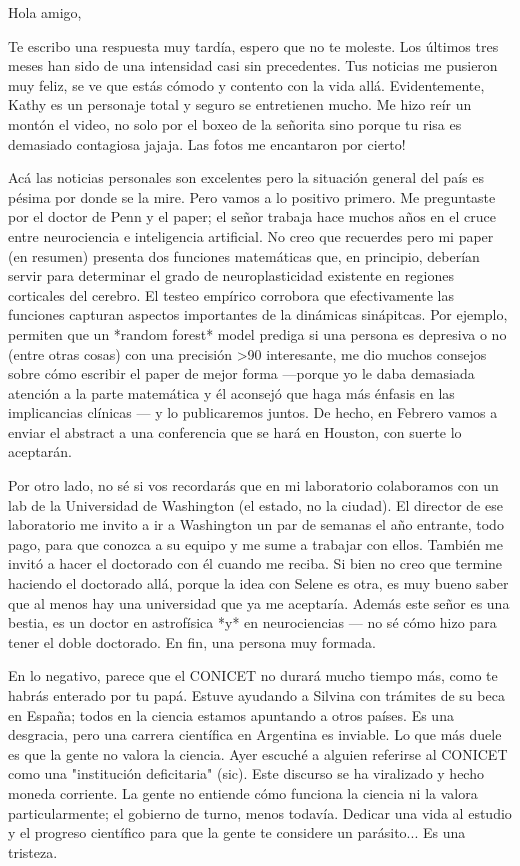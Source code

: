 \documentclass[a4paper]{article}
\begin{document}
    

Hola amigo,

Te escribo una respuesta muy tardía, espero que no te moleste. Los
últimos tres meses han sido de una intensidad casi sin precedentes. Tus noticias
me pusieron muy feliz, se ve que estás cómodo y contento con la vida allá.
Evidentemente, Kathy es un personaje total y seguro se entretienen mucho. Me
hizo reír un montón el video, no solo por el boxeo de la señorita sino porque tu
risa es demasiado contagiosa jajaja. Las fotos me encantaron por cierto! 

Acá las noticias personales son excelentes pero la situación general del país es
pésima por donde se la mire. Pero vamos a lo positivo primero. Me preguntaste
por el doctor de Penn y el paper; el señor trabaja hace muchos años en el cruce
entre neurociencia e inteligencia artificial. No creo que recuerdes pero mi
paper (en resumen) presenta dos funciones matemáticas que, en principio,
deberían servir para determinar el grado de neuroplasticidad existente en
regiones corticales del cerebro. El testeo empírico corrobora que efectivamente
las funciones capturan aspectos importantes de la dinámicas sinápitcas. Por
ejemplo, permiten que un *random forest* model prediga si una persona
es depresiva o no (entre otras cosas) con una precisión >90%
interesante, me dio muchos consejos sobre cómo escribir el paper de mejor
forma ---porque yo le daba demasiada atención a la parte matemática y él
aconsejó que haga más énfasis en las implicancias clínicas --- y lo
publicaremos juntos. De hecho, en Febrero vamos a enviar el abstract a una
conferencia que se hará en Houston, con suerte lo aceptarán.

Por otro lado, no sé si vos recordarás que en mi laboratorio colaboramos con un
lab de la Universidad de Washington (el estado, no la ciudad). El director de
ese laboratorio me invito a ir a Washington un par de semanas el año entrante,
todo pago, para que conozca a su equipo y me sume a trabajar con ellos. También
me invitó a hacer el doctorado con él cuando me reciba. Si bien no creo que
termine haciendo el doctorado allá, porque la idea con Selene es otra, es muy
bueno saber que al menos hay una universidad que ya me aceptaría. Además este
señor es una bestia, es un doctor en astrofísica *y* en neurociencias --- no sé
cómo hizo para tener el doble doctorado. En fin, una persona muy formada. 

En lo negativo, parece que el CONICET no durará mucho tiempo más, como te habrás
enterado por tu papá. Estuve ayudando a Silvina con trámites de su beca en
España; todos en la ciencia estamos apuntando a otros países. Es una desgracia,
pero una carrera científica en Argentina es inviable. Lo que más
duele es que la gente no valora la ciencia. Ayer escuché a alguien referirse al
CONICET como una "institución deficitaria" (sic). Este discurso se ha viralizado
y hecho moneda corriente. La gente no entiende cómo funciona la ciencia ni la
valora particularmente; el gobierno de turno, menos todavía. Dedicar una vida al
estudio y el progreso científico para que la gente te considere un parásito...
Es una tristeza.
\end{document}
